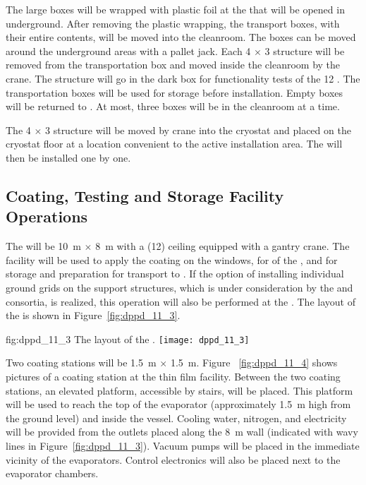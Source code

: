 The large  boxes will be wrapped with plastic foil at the  that will be opened in  underground. After removing the plastic wrapping, the transport boxes, with their entire contents, will be moved into the cleanroom. The  boxes can be moved around the underground areas with a pallet jack. Each \num{4} $\times$ \num{3} structure will be removed from the transportation box and moved inside the cleanroom by the crane. The structure will go in the dark box for functionality tests of the \num{12} . The transportation boxes will be used for storage before installation. Empty boxes will be returned to . At most, three  boxes will be in the cleanroom at a time.

The \num{4} $\times$ \num{3} structure will be moved by crane into the cryostat and placed on the cryostat floor at a location convenient to the active installation area. The  will then be installed one by one. 

\subsection{Coating, Testing and Storage Facility Operations}
\label{subsec:dp-pds-itf}

The  will be \SI{10}{\m} $\times$ \SI{8}{\m} with a (\SI{12}{\ft}) ceiling equipped with a gantry crane. The facility will be used to apply the  coating on the  windows, for  of the , and for storage and preparation for transport to \surf. If the option of installing individual ground grids on the  support structures, which is under consideration by the \dual {} and  consortia, is realized, this operation will also be performed at the . The layout of the  is shown in Figure~\ref{fig:dppd_11_3}.

\begin{dunefigure}{fig:dppd_11_3}
{The layout of the .}
\texttt{[image: dppd\_11\_3]}
\end{dunefigure}

Two coating stations will be \SI{1.5}{\m} $\times$ \SI{1.5}{\m}. Figure ~\ref{fig:dppd_11_4} shows pictures of a  coating station at the  thin film facility. Between the two coating stations, an elevated platform, accessible by stairs, will be placed. This platform will be used to reach the top of the evaporator (approximately \SI{1.5}{\m} high from the ground level) and inside the vessel. Cooling water, nitrogen, and electricity will be provided from the outlets placed along the \SI{8}{\m} wall (indicated with wavy lines in Figure~\ref{fig:dppd_11_3}). Vacuum pumps will be placed in the immediate vicinity of the evaporators. Control electronics will also be placed next to the evaporator chambers. 

